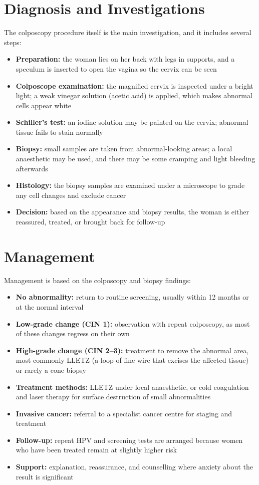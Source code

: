 \section*{Diagnosis and Investigations}
The colposcopy procedure itself is the main investigation, and it includes several steps:

\begin{itemize}
    \item \textbf{Preparation:} the woman lies on her back with legs in supports, and a speculum is inserted to open the vagina so the cervix can be seen
    \item \textbf{Colposcope examination:} the magnified cervix is inspected under a bright light; a weak vinegar solution (acetic acid) is applied, which makes abnormal cells appear white
    \item \textbf{Schiller's test:} an iodine solution may be painted on the cervix; abnormal tissue fails to stain normally
    \item \textbf{Biopsy:} small samples are taken from abnormal-looking areas; a local anaesthetic may be used, and there may be some cramping and light bleeding afterwards
    \item \textbf{Histology:} the biopsy samples are examined under a microscope to grade any cell changes and exclude cancer
    \item \textbf{Decision:} based on the appearance and biopsy results, the woman is either reassured, treated, or brought back for follow-up
\end{itemize}

\section*{Management}
Management is based on the colposcopy and biopsy findings:

\begin{itemize}
    \item \textbf{No abnormality:} return to routine screening, usually within 12 months or at the normal interval
    \item \textbf{Low-grade change (CIN 1):} observation with repeat colposcopy, as most of these changes regress on their own
    \item \textbf{High-grade change (CIN 2--3):} treatment to remove the abnormal area, most commonly LLETZ (a loop of fine wire that excises the affected tissue) or rarely a cone biopsy
    \item \textbf{Treatment methods:} LLETZ under local anaesthetic, or cold coagulation and laser therapy for surface destruction of small abnormalities
    \item \textbf{Invasive cancer:} referral to a specialist cancer centre for staging and treatment
    \item \textbf{Follow-up:} repeat HPV and screening tests are arranged because women who have been treated remain at slightly higher risk
    \item \textbf{Support:} explanation, reassurance, and counselling where anxiety about the result is significant
\end{itemize}


